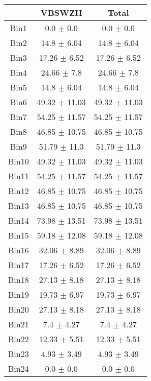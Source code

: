   \begin{tabular}{|c|c|c|}
  \hline
      & VBSWZH & Total \\ \cline{1-3} 
     \hline\hline
     Bin1 & 0.0 $\pm$ 0.0 & 0.0 $\pm$ 0.0 \\ \cline{1-3} 
     Bin2 & 14.8 $\pm$ 6.04 & 14.8 $\pm$ 6.04 \\ \cline{1-3} 
     Bin3 & 17.26 $\pm$ 6.52 & 17.26 $\pm$ 6.52 \\ \cline{1-3} 
     Bin4 & 24.66 $\pm$ 7.8 & 24.66 $\pm$ 7.8 \\ \cline{1-3} 
     Bin5 & 14.8 $\pm$ 6.04 & 14.8 $\pm$ 6.04 \\ \cline{1-3} 
     Bin6 & 49.32 $\pm$ 11.03 & 49.32 $\pm$ 11.03 \\ \cline{1-3} 
     Bin7 & 54.25 $\pm$ 11.57 & 54.25 $\pm$ 11.57 \\ \cline{1-3} 
     Bin8 & 46.85 $\pm$ 10.75 & 46.85 $\pm$ 10.75 \\ \cline{1-3} 
     Bin9 & 51.79 $\pm$ 11.3 & 51.79 $\pm$ 11.3 \\ \cline{1-3} 
     Bin10 & 49.32 $\pm$ 11.03 & 49.32 $\pm$ 11.03 \\ \cline{1-3} 
     Bin11 & 54.25 $\pm$ 11.57 & 54.25 $\pm$ 11.57 \\ \cline{1-3} 
     Bin12 & 46.85 $\pm$ 10.75 & 46.85 $\pm$ 10.75 \\ \cline{1-3} 
     Bin13 & 46.85 $\pm$ 10.75 & 46.85 $\pm$ 10.75 \\ \cline{1-3} 
     Bin14 & 73.98 $\pm$ 13.51 & 73.98 $\pm$ 13.51 \\ \cline{1-3} 
     Bin15 & 59.18 $\pm$ 12.08 & 59.18 $\pm$ 12.08 \\ \cline{1-3} 
     Bin16 & 32.06 $\pm$ 8.89 & 32.06 $\pm$ 8.89 \\ \cline{1-3} 
     Bin17 & 17.26 $\pm$ 6.52 & 17.26 $\pm$ 6.52 \\ \cline{1-3} 
     Bin18 & 27.13 $\pm$ 8.18 & 27.13 $\pm$ 8.18 \\ \cline{1-3} 
     Bin19 & 19.73 $\pm$ 6.97 & 19.73 $\pm$ 6.97 \\ \cline{1-3} 
     Bin20 & 27.13 $\pm$ 8.18 & 27.13 $\pm$ 8.18 \\ \cline{1-3} 
     Bin21 & 7.4 $\pm$ 4.27 & 7.4 $\pm$ 4.27 \\ \cline{1-3} 
     Bin22 & 12.33 $\pm$ 5.51 & 12.33 $\pm$ 5.51 \\ \cline{1-3} 
     Bin23 & 4.93 $\pm$ 3.49 & 4.93 $\pm$ 3.49 \\ \cline{1-3} 
     Bin24 & 0.0 $\pm$ 0.0 & 0.0 $\pm$ 0.0 \\ \cline{1-3} 

\end{tabular}
